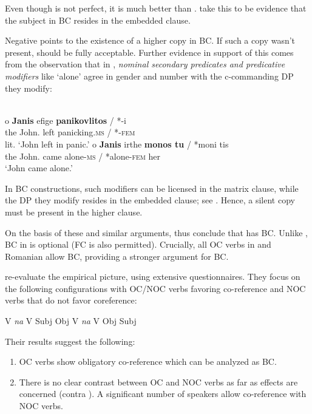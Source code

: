 \documentclass[output=paper]{langsci/langscibook}
\begin{document}
Even though  is not perfect, it is much better than . \citet{Alexiadou2010} take this to be evidence that the subject in BC resides in the embedded clause. 

Negative  points to the existence of a higher copy in BC. If such a copy wasn’t present,  should be fully acceptable. Further evidence in support of this comes from the observation that in , \textit{nominal secondary predicates and predicative modifiers} like ‘alone’ agree in gender and number with the c-commanding DP they modify:\pagebreak

\ea%
    \label{ex:alexiadou:13}
    \\
\ea \gll  o    \textbf{Janis}        efige  \textbf{panikovlitos} / *-i      \\
             the John.{\NOM}  left    panicking.\textsc{ms} / *-\textsc{fem}\\ 
    \glt        lit. ‘John left in panic.’
\ex \gll o    \textbf{Janis}         irthe   \textbf{monos tu} / *moni tis\\
               the John.{\NOM}  came   alone-\textsc{ms} / *alone-\textsc{fem} her\\
    \glt       ‘John came alone.’  
    \z
\z

In BC constructions, such modifiers can be licensed in the matrix clause, while the DP they modify resides in the embedded clause; see \citet[103--104, examples (36--38)]{Alexiadou2010}. Hence, a silent copy must be present in the higher clause. 

On the basis of these and similar arguments, \citet{Alexiadou2010} thus conclude that  has BC. Unlike , BC in  is optional (FC is also permitted). Crucially, all OC verbs in  and Romanian allow BC, providing a stronger argument for BC.

\citet{Tsakali2017} re-evaluate the empirical picture, using extensive questionnaires. They focus on the following configurations with OC\slash NOC verbs favoring co-reference and NOC verbs that do not favor coreference:


\ea%
    \label{ex:alexiadou:14}
    \ea V \textit{na} V Subj Obj
    \ex V \textit{na} V Obj Subj
    \z
\z

Their results suggest the following:

\begin{enumerate}
\item OC verbs show obligatory co-reference which can be analyzed as BC.
\item There is no clear contrast between OC and NOC verbs as far as  effects are concerned (contra \citealt{Alexiadou2010}). A significant number of speakers allow co-reference with NOC verbs. 
\end{enumerate}
\end{document}
